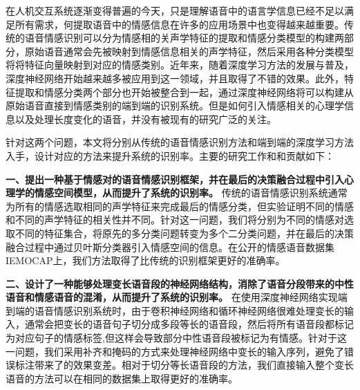 \begin{cabstract}
  在人机交互系统逐渐变得普遍的今天，只是理解语音中的语言学信息已经不足以满足所有需求，何提取语音中的情感信息在许多的应用场景中也变得越来越重要。传统的语音情感识别可以分为情感相的关声学特征的提取和情感分类模型的构建两部分，原始语音通常会先被映射到情感信息相关的声学特征，然后采用各种分类模型将将特征向量映射到对应的情感类别。近年来，随着深度学习方法的发展与普及，深度神经网络开始越来越多被应用到这一领域，并且取得了不错的效果。此外，特征提取和情感分类两个部分也开始被整合到一起，通过深度神经网络将可以构建从原始语音直接到情感类别的端到端的识别系统。但是如何引入情感相关的心理学信息以及处理长度变化的语音，并没有被现有的研究广泛的关注。
  
  针对这两个问题，本文将分别从传统的语音情感识别方法和端到端的深度学习方法入手，设计对应的方法来提升系统的识别率。主要的研究工作和和贡献如下：
 
  \textbf{一、提出一种基于情感对的语音情感识别框架，并在最后的决策融合过程中引入心理学的情感空间模型，从而提升了系统的识别率。} 传统的语音情感识别系统通常为所有的情感选取相同的声学特征来完成最后的情感分类，但实验证明不同的情感和不同的声学特征的相关性并不同。针对这一问题，我们将分别为不同的情感对选取不同的特征集合，将原先的多分类问题转变为多个二分类问题，并在最后的决策融合过程中通过贝叶斯分类器引入情感空间的信息。在公开的情感语音数据集IEMOCAP上，我们方法取得了比传统的识别框架更好的准确率。

  \textbf{二、设计了一种能够处理变长语音段的神经网络结构，消除了语音分段带来的中性语音和情感语音的混淆，从而提升了系统的识别率。} 在使用深度神经网络实现端到端的语音情感识别系统时，由于卷积神经网络和循环神经网络很难处理变长的输入，通常会把变长的语音句子切分成多段等长的语音段，然后将所有语音段都标记为对应句子的情感标签,但这样会导致部分中性语音段被标记为有情感。针对于这一问题，我们采用补齐和掩码的方式来处理神经网络中变长的输入序列，避免了错误标注带来了的效果变差。相对于切分等长语音段的方法，我们直接输入整个变长语音的方法可以在相同的数据集上取得更好的准确率。


\end{cabstract}
